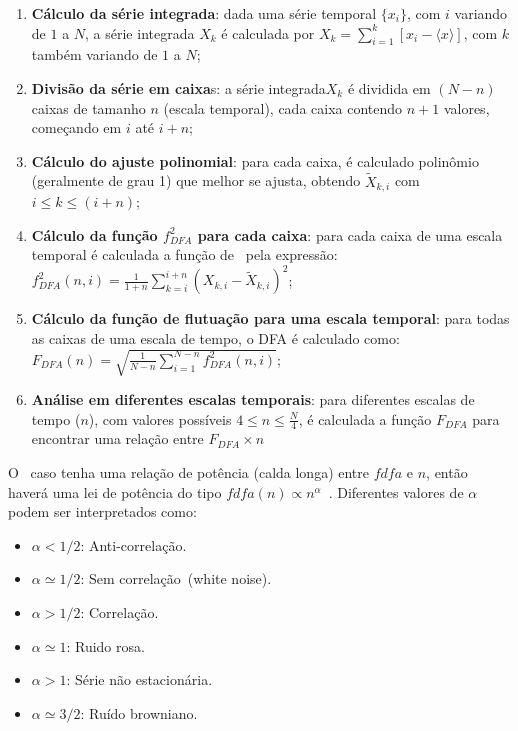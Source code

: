 \begin{algorithm} \caption{\dfa} \label{alg:dfa}


\begin{enumerate}
\item \textbf{Cálculo da série integrada}: dada uma série temporal $\{x_{i}\}$, com $i$ variando de $1$ a $N$, a série integrada $X_{k}$ é calculada por $X_{k} = \sum_{i=1}^{k}\left[x_{i} - \langle x \rangle \right]$, com $k$ também variando de $1$ a $N$;
\item \textbf{Divisão da série em caixa}s: a série integrada$X_{k}$ é dividida em $(N - n)$ caixas de tamanho $n$ (escala temporal), cada caixa contendo $n + 1$ valores, começando em $i$ até $i + n$;
\item \textbf{Cálculo do ajuste polinomial}: para cada caixa, é calculado polinômio (geralmente de grau 1) que melhor se ajusta, obtendo $\widetilde{X}_{k, i}$ com $i \le k \le (i + n)$;
\item \textbf{Cálculo da função $f_{DFA}^{2}$ para cada caixa}: para cada caixa de uma escala temporal é calculada a função de \dfa~pela expressão:\\[10pt]
 $f_{DFA}^{2}(n, i) = \frac{1}{1+n} \sum_{k=i}^{i + n}(X_{k,i}-\widetilde{X}_{k,i})^{2}$;
\item \textbf{Cálculo da função de flutuação para uma escala temporal}: para todas as caixas de uma escala de tempo, o DFA é calculado como: \\[10pt]
        $F_{DFA}(n) = \sqrt{\frac{1}{N - n} \sum_{i=1}^{N-n} f_{DFA}^{2}(n, i)}$;
\item \textbf{Análise em diferentes escalas temporais}: para diferentes escalas de tempo ($n$), com valores possíveis $4 \le n \le \frac{N}{4}$, é calculada a função $F_{DFA}$ para encontrar uma relação entre $F_{DFA} \times n$
  \end{enumerate}
\end{algorithm}


O \dfa~caso tenha uma relação de potência (calda longa) entre $fdfa$ e $n$, então haverá uma lei de potência do tipo $fdfa(n) \propto n^\alpha $~\cite{Zebende2013}. Diferentes valores de $\alpha$ podem ser interpretados como:

\begin{itemize}
\item $\alpha < 1/2$: Anti-correlação.
\item $\alpha \simeq 1/2$: Sem correlação~(white noise).
\item $\alpha > 1/2$: Correlação.
\item $\alpha \simeq 1$: Ruido rosa.
\item $\alpha > 1$: Série não estacionária.
\item $\alpha \simeq 3/2$: Ruído browniano.
\end{itemize}


